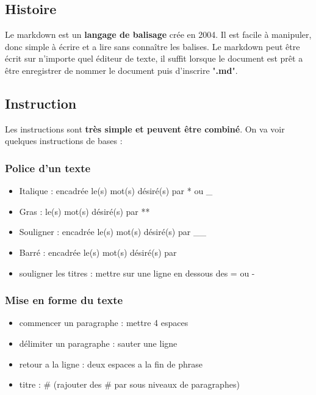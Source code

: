 \subsection{Histoire}

Le markdown est un \textbf{langage de balisage} crée en 2004. Il est facile à manipuler, donc simple à écrire et a lire sans connaître les balises.
Le markdown peut être écrit sur n'importe quel éditeur de texte, il suffit lorsque le document est prêt a être enregistrer de nommer le document puis d'inscrire "\textbf{.md}".

\subsection{Instruction}

Les instructions sont \textbf{très simple et peuvent être combiné}. 
On va voir quelques instructions de bases : 

\subsubsection{Police d'un texte}
\begin{itemize}
	\item Italique : encadrée le(s) mot(s) désiré(s) par * ou _
	\item Gras :  le(s) mot(s) désiré(s) par **
	\item Souligner : encadrée le(s) mot(s) désiré(s) par __
	\item Barré : encadrée le(s) mot(s) désiré(s) par ~~
	\item souligner les titres : mettre sur une ligne en dessous des = ou -
\end{itemize}

\subsubsection{Mise en forme du texte}
\begin{itemize}
	\item commencer un paragraphe : mettre 4 espaces
	\item délimiter un paragraphe : sauter une ligne
	\item retour a la ligne : deux espaces a la fin de phrase
	\item titre : # (rajouter des # par sous niveaux de paragraphes)
\end{itemize}

